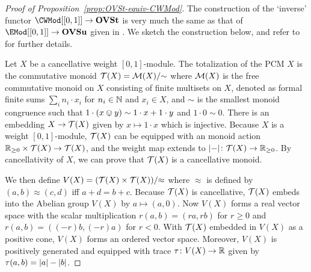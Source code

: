 \documentclass[%
	submission,
copyright,creativecommons,UKenglish]{eptcs}
\begin{document}


\begin{proof}[Proof of Proposition~\ref{prop:OVSt-equiv-CWMod}]
The construction of the `inverse' functor $\CWMod[[0,1]]\to \OVSt$
is very much the same as that of
$\EMod[[0,1]]\to \OVSu$ given in \cite[\S\,3.1]{JacobsMF2016}.
We sketch the construction below, and
refer to \cite[\S\,7.2.1]{Cho2019PhD} for further details.

Let $X$ be a cancellative weight $[0,1]$-module.
The totalization \cite{jacobs2012coreflections}
of the PCM $X$
is the commutative monoid $\mathcal{T}(X)=\mathcal{M}(X)/{\sim}$
where $\mathcal{M}(X)$
is the free commutative monoid on $X$
consisting of finite multisets on $X$,
denoted as formal finite sums $\sum_i n_i \cdot x_i$
for $n_i\in\mathbb{N}$ and $x_i\in X$,
and $\sim$
is the smallest monoid congruence
such that $1\cdot (x\ovee y)\sim 1\cdot x + 1\cdot y$
and $1\cdot 0\sim 0$.
There is an embedding $X\to \mathcal{T}(X)$
given by $x\mapsto 1\cdot x$ which is injective.
Because $X$ is a weight $[0,1]$-module,
$\mathcal{T}(X)$ can be equipped with
an monoid action $\mathbb{R}_{\ge 0}\times \mathcal{T}(X)\to \mathcal{T}(X)$,
and the weight map
extends to $\lvert-\rvert\colon \mathcal{T}(X)\to \mathbb{R}_{\ge 0}$.
By cancellativity of $X$,
we can prove that $\mathcal{T}(X)$ is a cancellative monoid.

We then define $V(X)=(\mathcal{T}(X)\times \mathcal{T}(X))/{\approx}$
where $\approx$ is defined by
$(a,b)\approx (c,d)$ iff $a+d=b+c$.
Because $\mathcal{T}(X)$ is cancellative,
$\mathcal{T}(X)$ embeds into the Abelian group $V(X)$
by $a\mapsto (a,0)$.
Now $V(X)$ forms a real vector space with
the scalar multiplication $r(a,b)=(ra,rb)$
for $r\ge 0$
and $r(a,b)=((-r)b,(-r)a)$
for $r< 0$.
With $\mathcal{T}(X)$ embedded in $V(X)$
as a positive cone, $V(X)$ forms an ordered vector space.
Moreover, $V(X)$ is positively generated and equipped with
trace $\tau\colon V(X)\to \mathbb{R}$ given by $\tau(a,b)=\lvert a\rvert-\lvert b\rvert$.
\end{proof}
\end{document}

